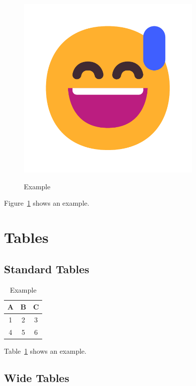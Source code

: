 \documentclass[letterpaper]{article}
\begin{document}
\begin{figure}
\begin{minipage}[b]{0.3\textwidth}
        \includegraphics[width=0.8\textwidth]{assets/example.pdf}
        \label{fig:grid2}
    \end{minipage}
    \caption{Example}
\end{figure}

Figure~\ref{fig:grid2} shows an example.

\section{Tables}


\subsection{Standard Tables}

\begin{table}
    \centering
    \begin{tabular}{|c|c|c|}
        \hline
        A & B & C \\
        \hline
        1 & 2 & 3 \\
        4 & 5 & 6 \\
        \hline
    \end{tabular}
    \caption{Example}
    \label{tab:standard}
\end{table}

Table~\ref{tab:standard} shows an example.


\subsection{Wide Tables}
\end{document}
